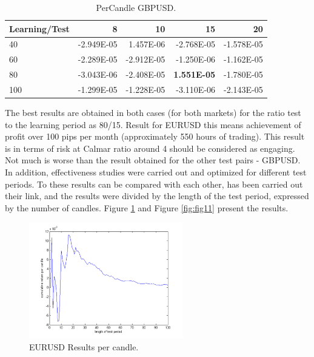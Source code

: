 \documentclass[runningheads,a4paper]{llncs}
\begin{document}
\begin{table}[h!]
\centering
\caption{PerCandle GBPUSD.}
\label{tab:tab4}
\begin{tabular}{|l|r|r|r|r|} \hline
Learning/Test &	8	 & 	10 &		15	 &	20\\ \hline
40	 & -2.949E-05 & 	1.457E-06 & 	-2.768E-05	 & -1.578E-05\\ \hline
60	 & -2.289E-05 & 	-2.912E-05 & 	-1.250E-06 & 	-1.162E-05\\ \hline
80	 & -3.043E-06 & 	-2.408E-05	 & \textbf{1.551E-05} & 	-1.780E-05\\ \hline
100	 & -1.299E-05 & 	-1.228E-05 & 	-3.110E-06	 & -2.143E-05\\ \hline
\end{tabular}
\end{table}
\FloatBarrier


The best results are obtained in both cases (for both markets) for the ratio test to the learning period as 80/15. Result for EURUSD this means achievement of profit over 100 pips per month (approximately 550 hours of trading). This result is in terms of risk at Calmar ratio around 4 should be considered as engaging. Not much is worse than the result obtained for the other test pairs - GBPUSD.\\

In addition, effectiveness studies were carried out and optimized for different test periods. To these results can be compared with each other, has been carried out their link, and the results were divided by the length of the test period, expressed by the number of candles. 
Figure \ref{fig:fig10} and Figure \ref{fig:fig11} present the results.

\begin{figure}[h!]
\centering
\includegraphics[width = 0.6\textwidth]{figures/rys10.png}
\caption{EURUSD Results per candle.}
\label{fig:fig10}
\end{figure}
\FloatBarrier
\end{document}
